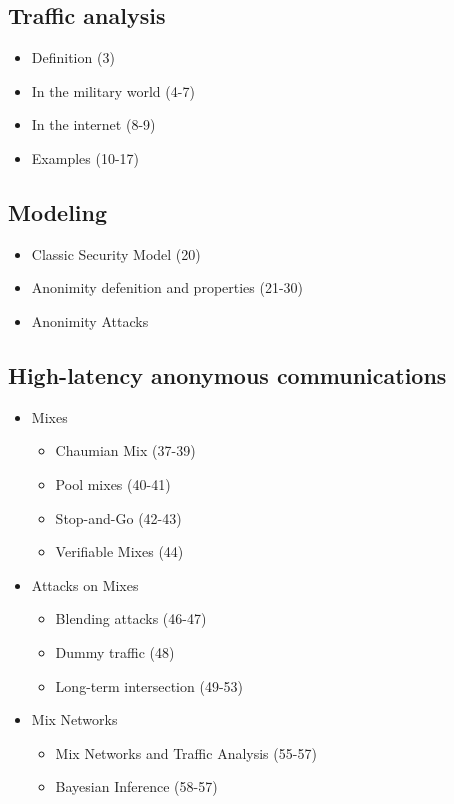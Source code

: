 \documentclass[../overview.tex]{subfiles}
\begin{document}
\subsection{Traffic analysis}
\begin{itemize}
		\item Definition (3)
		\item In the military world (4-7) 
		\item In the internet (8-9)
		\item Examples (10-17)
\end{itemize}

\subsection{Modeling}
\begin{itemize}
		\item Classic Security Model (20)
		\item Anonimity defenition and properties (21-30)
		\item Anonimity Attacks
\end{itemize}

\subsection{High-latency anonymous communications}
\begin{itemize}
		\item Mixes
		\begin{itemize}
				\item Chaumian Mix (37-39)
				\item Pool mixes (40-41)
				\item Stop-and-Go (42-43)
				\item Verifiable Mixes (44)
		\end{itemize}
		\item Attacks on Mixes
		\begin{itemize}
				\item Blending attacks (46-47)
				\item Dummy traffic (48)
				\item Long-term intersection (49-53)
		\end{itemize}
		\item Mix Networks
		\begin{itemize}
				\item Mix Networks and Traffic Analysis (55-57)
				\item Bayesian Inference (58-57)
		\end{itemize}
\end{itemize}
\end{document}

